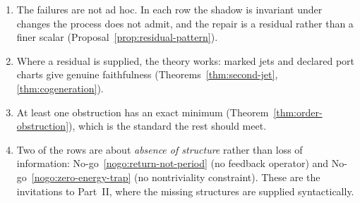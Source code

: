 \begin{enumerate}
\item The failures are not ad hoc.  In each row the shadow is invariant under changes the
  process does not admit, and the repair is a residual rather than a finer scalar
  (Proposal~\ref{prop:residual-pattern}).
\item Where a residual is supplied, the theory works: marked jets and declared port charts
  give genuine faithfulness (Theorems~\ref{thm:second-jet}, \ref{thm:cogeneration}).
\item At least one obstruction has an exact minimum
  (Theorem~\ref{thm:order-obstruction}), which is the standard the rest should meet.
\item Two of the rows are about \emph{absence of structure} rather than loss of
  information: No-go~\ref{nogo:return-not-period} (no feedback operator) and
  No-go~\ref{nogo:zero-energy-trap} (no nontriviality constraint).  These are the
  invitations to Part~II, where the missing structures are supplied syntactically.
\end{enumerate}
